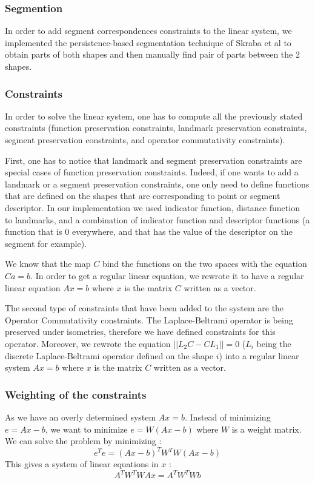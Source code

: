 \documentclass[10pt,twocolumn,letterpaper]{article}
\begin{document}
\subsubsection*{Segmention} %
In order to add segment correspondences constraints to the linear system, we implemented the persistence-based segmentation technique of Skraba et al to obtain parts of both shapes and then manually find pair of parts between the 2 shapes.
\subsubsection*{Constraints} %
In order to solve the linear system, one has to compute all the previously stated constraints (function preservation constraints, landmark preservation constraints, segment preservation constraints, and operator commutativity constraints). 

First, one has to notice that landmark and segment preservation constraints are special cases of function preservation constraints. Indeed, if one wants to add a landmark or a segment preservation constraints, one only need to define functions that are defined on the shapes that are corresponding to point or segment descriptor. In our implementation we used indicator function, distance function to landmarks, and a combination of indicator function and descriptor functions (a function that is $0$ everywhere, and that has the value of the descriptor on the segment for example). 

We know that the map $C$ bind the functions on the two spaces with the equation $Ca = b$. In order to get a regular linear equation, we rewrote it to have a regular linear equation $Ax = b$ where $x$ is the matrix $C$ written as a vector.

The second type of constraints that have been added to the system are the Operator Commutativity constraints. The Laplace-Beltrami operator is being preserved under isometries, therefore we have defined constraints for this operator. Moreover, we rewrote the equation $||L_{2}C - CL_{1}|| = 0$ ($L_{i}$ being the discrete Laplace-Beltrami operator defined on the shape $i$) into a regular linear system $Ax = b$ where $x$ is the matrix $C$ written as a vector. 

\subsubsection*{Weighting of the constraints}
As we have an overly determined system $Ax = b$. Instead of minimizing $e = Ax-b$, we want to minimize $e = W(Ax-b)$ where $W$ is a weight matrix. We can solve the problem by minimizing :
\begin{equation}
e^{T}e = (Ax-b)^{T}W^{T}W(Ax-b)
\end{equation}
This gives a system of linear equations in $x$ :
\begin{equation}
A^{T}W^{T}WAx = A^{T}W^{T}Wb
\end{equation}
\end{document}
